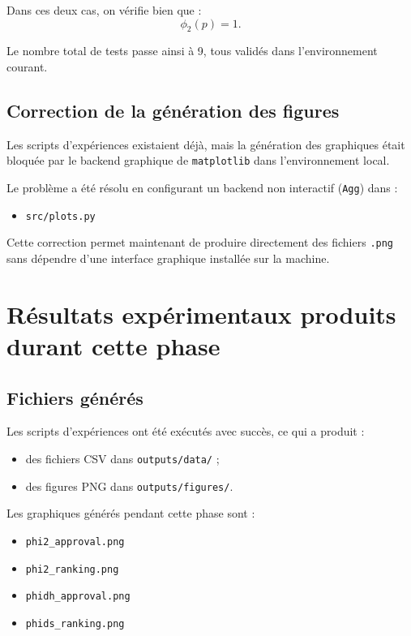 \documentclass[11pt,a4paper]{article}
\begin{document}
Dans ces deux cas, on v\'erifie bien que :
\[
\phi_2(p)=1.
\]

Le nombre total de tests passe ainsi \`a 9, tous valid\'es dans l'environnement courant.

\subsection{Correction de la g\'en\'eration des figures}

Les scripts d'exp\'eriences existaient d\'ej\`a, mais la g\'en\'eration des graphiques \'etait bloqu\'ee par le backend graphique de \texttt{matplotlib} dans l'environnement local.

Le probl\`eme a \'et\'e r\'esolu en configurant un backend non interactif (\texttt{Agg}) dans :
\begin{itemize}[leftmargin=*]
    \item \texttt{src/plots.py}
\end{itemize}

Cette correction permet maintenant de produire directement des fichiers \texttt{.png} sans d\'ependre d'une interface graphique install\'ee sur la machine.

\section{R\'esultats exp\'erimentaux produits durant cette phase}

\subsection{Fichiers g\'en\'er\'es}

Les scripts d'exp\'eriences ont \'et\'e ex\'ecut\'es avec succ\`es, ce qui a produit :

\begin{itemize}[leftmargin=*]
    \item des fichiers CSV dans \texttt{outputs/data/} ;
    \item des figures PNG dans \texttt{outputs/figures/}.
\end{itemize}

Les graphiques g\'en\'er\'es pendant cette phase sont :
\begin{itemize}[leftmargin=*]
    \item \texttt{phi2\_approval.png}
    \item \texttt{phi2\_ranking.png}
    \item \texttt{phidh\_approval.png}
    \item \texttt{phids\_ranking.png}
\end{itemize}
\end{document}
